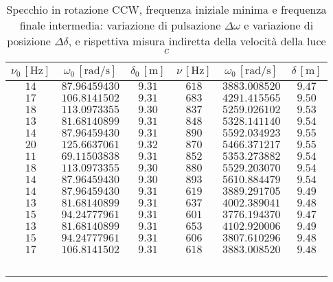 \documentclass[]{article}
\begin{document}
        \begin{table}
            \centering

 \begin{tabular}{||c|c|c||c|c|c||}
        \hline
        $\nu_0\, [\text{Hz}] $ & $\omega_0\, [\text{rad/s}] $ & $\delta_0\, [\text{m}] $ & $\nu\, [\text{Hz}] $ & $\omega_0\, [\text{rad/s}] $ & $\delta\, [\text{m}] $ \\
        \hline\hline
        $14$ & $87.96459430 $ & $9.31$ & $618$ & $3883.008520$ & $9.47$\\\hline
        $17$ & $106.8141502 $ & $9.31$ & $683$ & $4291.415565$ & $9.50$\\\hline
        $18$ & $113.0973355 $ & $9.30$ & $837$ & $5259.026102$ & $9.53$\\\hline
        $13$ & $81.68140899 $ & $9.31$ & $848$ & $5328.141140$ & $9.54$\\\hline
        $14$ & $87.96459430 $ & $9.31$ & $890$ & $5592.034923$ & $9.55$\\\hline
        $20$ & $125.6637061 $ & $9.32$ & $870$ & $5466.371217$ & $9.55$\\\hline
        $11$ & $69.11503838 $ & $9.31$ & $852$ & $5353.273882$ & $9.54$\\\hline
        $18$ & $113.0973355 $ & $9.30$ & $880$ & $5529.203070$ & $9.54$\\\hline
        $14$ & $87.96459430 $ & $9.30$ & $893$ & $5610.884479$ & $9.54$\\\hline
        $14$ & $87.96459430 $ & $9.31$ & $619$ & $3889.291705$ & $9.49$\\\hline
        $13$ & $81.68140899 $ & $9.31$ & $637$ & $4002.389041$ & $9.48$\\\hline
        $15$ & $94.24777961 $ & $9.31$ & $601$ & $3776.194370$ & $9.47$\\\hline
        $13$ & $81.68140899 $ & $9.31$ & $653$ & $4102.920006$ & $9.49$\\\hline
        $15$ & $94.24777961 $ & $9.31$ & $606$ & $3807.610296$ & $9.48$\\\hline
        $17$ & $106.8141502 $ & $9.31$ & $618$ & $3883.008520$ & $9.48$\\\hline

    \end{tabular}
 
    \caption{Specchio in rotazione CCW, frequenza iniziale minima e frequenza finale intermedia: variazione di pulsazione $\Delta\omega$ e variazione di posizione $\Delta\delta$, e rispettiva misura indiretta della velocità della luce $c$}

    \label{CCW_min_mid.csv}

\end{table}
\end{document}
